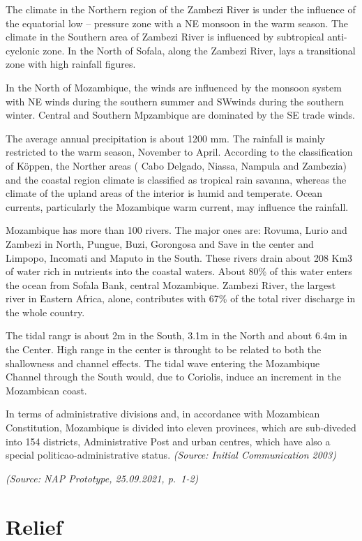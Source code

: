 \documentclass[
]{book}
\begin{document}
The climate in the Northern region of the Zambezi River is under the influence of the equatorial low -- pressure zone with a NE monsoon in the warm season. The climate in the Southern area of Zambezi River is influenced by subtropical anti-cyclonic zone. In the North of Sofala, along the Zambezi River, lays a transitional zone with high rainfall figures.

In the North of Mozambique, the winds are influenced by the monsoon system with NE winds during the southern summer and SWwinds during the southern winter. Central and Southern Mpzambique are dominated by the SE trade winds.

The average annual precipitation is about 1200 mm. The rainfall is mainly restricted to the warm season, November to April. According to the classification of Köppen, the Norther areas ( Cabo Delgado, Niassa, Nampula and Zambezia) and the coastal region climate is classified as tropical rain savanna, whereas the climate of the upland areas of the interior is humid and temperate. Ocean currents, particularly the Mozambique warm current, may influence the rainfall.

Mozambique has more than 100 rivers. The major ones are: Rovuma, Lurio and Zambezi in North, Pungue, Buzi, Gorongosa and Save in the center and Limpopo, Incomati and Maputo in the South. These rivers drain about 208 Km3 of water rich in nutrients into the coastal waters. About 80\% of this water enters the ocean from Sofala Bank, central Mozambique. Zambezi River, the largest river in Eastern Africa, alone, contributes with 67\% of the total river discharge in the whole country.

The tidal rangr is about 2m in the South, 3.1m in the North and about 6.4m in the Center. High range in the center is throught to be related to both the shallowness and channel effects. The tidal wave entering the Mozambique Channel through the South would, due to Coriolis, induce an increment in the Mozambican coast.

In terms of administrative divisions and, in accordance with Mozambican Constitution, Mozambique is divided into eleven provinces, which are sub-diveded into 154 districts, Administrative Post and urban centres, which have also a special politicao-administrative status. \emph{(Source: Initial Communication 2003)}

\emph{(Source: NAP Prototype, 25.09.2021, p.~1-2)}

\hypertarget{relief}{%
\section{Relief}\label{relief}}
\end{document}
